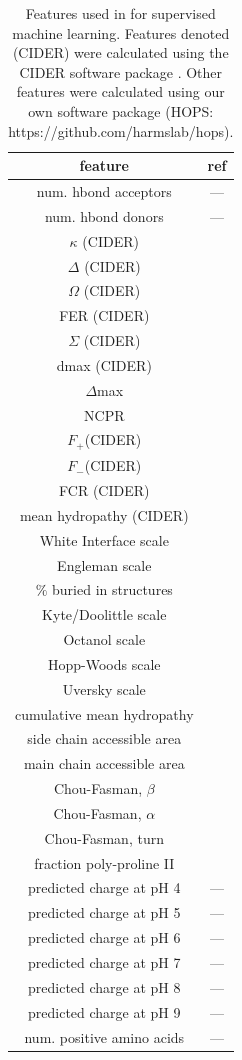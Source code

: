 \begin{table}[h!]\footnotesize %
\center
\scriptsize
\caption[Features used in for supervised machine
learning] {Features used in for supervised machine
learning. Features denoted (CIDER) were calculated using the CIDER
software package \citep{holehouse_cider:_2015}. Other features were
calculated using our own software package (HOPS: https://github.com/harmslab/hops).}
\scriptsize
\begin{tabular}{c|c}
feature & ref\tabularnewline
\hline 
num. hbond acceptors & ---\tabularnewline
num. hbond donors & ---\tabularnewline
$\kappa$ (CIDER) & \citep{holehouse_cider:_2015}\tabularnewline
$\Delta$ (CIDER) & \citep{holehouse_cider:_2015}\tabularnewline
$\Omega$ (CIDER) & \citep{holehouse_cider:_2015}\tabularnewline
FER (CIDER) & \citep{holehouse_cider:_2015}\tabularnewline
$\Sigma$ (CIDER) & \citep{holehouse_cider:_2015}\tabularnewline
dmax (CIDER) & \citep{holehouse_cider:_2015}\tabularnewline
$\Delta$max & \citep{holehouse_cider:_2015}\tabularnewline
NCPR & \citep{holehouse_cider:_2015}\tabularnewline
$F_{+}$(CIDER) & \citep{holehouse_cider:_2015}\tabularnewline
$F_{-}$(CIDER) & \citep{holehouse_cider:_2015}\tabularnewline
FCR (CIDER) & \citep{holehouse_cider:_2015}\tabularnewline
mean hydropathy (CIDER) & \citep{holehouse_cider:_2015}\tabularnewline
White Interface scale & \citep{hessa_recognition_2005}\tabularnewline
Engleman scale & \citep{engelman_identifying_1986}\tabularnewline
$\%$ buried in structures & \citep{schein_solubility_1990}\tabularnewline
Kyte/Doolittle scale & \citep{kyte_simple_1982}\tabularnewline
Octanol scale & \citep{wimley_experimentally_1996}\tabularnewline
Hopp-Woods scale & \citep{hopp_prediction_1981}\tabularnewline
Uversky scale & \citep{holehouse_cider:_2015}\tabularnewline
cumulative mean hydropathy & \citep{holehouse_cider:_2015}\tabularnewline
side chain accessible area & \citep{hubbard_naccess_1993}\tabularnewline
main chain accessible area & \citep{hubbard_naccess_1993}\tabularnewline
Chou-Fasman, $\beta$ & \citep{chou_empirical_1978}\tabularnewline
Chou-Fasman, $\alpha$ & \citep{chou_empirical_1978}\tabularnewline
Chou-Fasman, turn & \citep{chou_empirical_1978}\tabularnewline
fraction poly-proline II & \citep{holehouse_cider:_2015}\tabularnewline
predicted charge at pH 4 & ---\tabularnewline
predicted charge at pH 5 & ---\tabularnewline
predicted charge at pH 6 & ---\tabularnewline
predicted charge at pH 7 & ---\tabularnewline
predicted charge at pH 8 & ---\tabularnewline
predicted charge at pH 9 & ---\tabularnewline
num. positive amino acids & ---\tabularnewline

\end{tabular}
\end{table}
